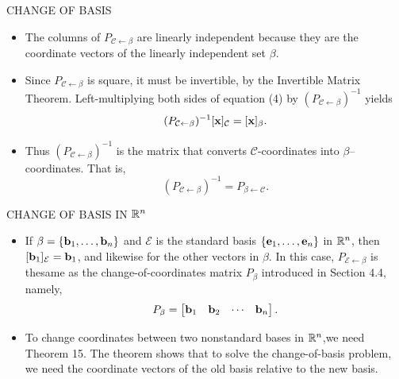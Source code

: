 \begin{frame}[shrink=9]{CHANGE OF BASIS}
\begin{itemize}
\item The columns of $P_{\mathcal C\leftarrow\beta}$ are linearly independent because they are the coordinate vectors of the linearly independent set $\beta$.
\item Since $P_{\mathcal C\leftarrow\beta}$ is square, it must be invertible, by the Invertible Matrix Theorem. Left-multiplying both sides of equation (4) by $(P_{\mathcal C\leftarrow\beta})^{-1}$ yields
\[
(P_{\mathcal C\leftarrow\beta})^{-1}[\mathbf{x}]_{\mathcal C}=[\mathbf{x}]_{\beta}.
\]
\item Thus $(P_{\mathcal C\leftarrow\beta})^{-1}$ is the matrix that converts $\mathcal C$-coordinates into $\beta$--coordinates. That is,
\begin{equation*}
(P_{\mathcal C\leftarrow\beta})^{-1}=P_{\beta\leftarrow\mathcal C}. \tag{6}
\end{equation*}
\end{itemize}
\end{frame}

\begin{frame}[shrink=10]{CHANGE OF BASIS IN $\mathbb{R}^n$}
\begin{itemize}
\item If $\beta=\{\mathbf{b}_1,\ldots,\mathbf{b}_n\}$ and $\mathcal E$ is the standard basis $\{\mathbf{e}_1,\ldots,\mathbf{e}_n\}$ in $\mathbb{R}^n$, then $[\mathbf{b}_1]_{\mathcal E}=\mathbf{b}_1$, and likewise for the other vectors in $\beta$. In this case, $P_{\mathcal E\leftarrow\beta}$ is thesame as the change-of-coordinates matrix $P_{\beta}$ introduced in Section 4.4, namely,
\[
P_{\beta}=\begin{bmatrix}\mathbf{b}_1&\mathbf{b}_2&\cdots&\mathbf{b}_n\end{bmatrix}.
\]
\item To change coordinates between two nonstandard bases in $\mathbb{R}^n$,we need Theorem 15. The theorem shows that to solve the change-of-basis problem, we need the coordinate vectors of the old basis relative to the new basis.
\end{itemize}
\end{frame}

